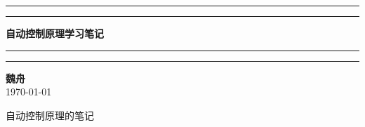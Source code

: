\documentclass[11pt,a4paper]{book}
\begin{document}
\begin{titlepage}
    \centering
    \vspace*{2cm} %
    \rule{\textwidth}{1pt}\par
    \vspace{0.2cm}
    \rule{\textwidth}{3pt}\par
    
    \vspace{1.5cm}
    
    {\Huge \bfseries 自动控制原理学习笔记 \par}
    \vspace{0.5cm}
    {\Large \itshape  \par} 
    
    \vspace{1cm}


    \vspace{1cm}
    
    \rule{\textwidth}{3pt}\par
    \vspace{0.2cm}
    \rule{\textwidth}{1pt}\par
    
    \vspace{2cm}
    
    \begin{flushright}
        {\Large \textbf{魏舟} } \\
        \vspace{0.5cm}
        {\large \today}
    \end{flushright}
    
    \vfill
    
    {\color{gray} \footnotesize 自动控制原理的笔记}

\end{titlepage}

\tableofcontents


\end{document}
